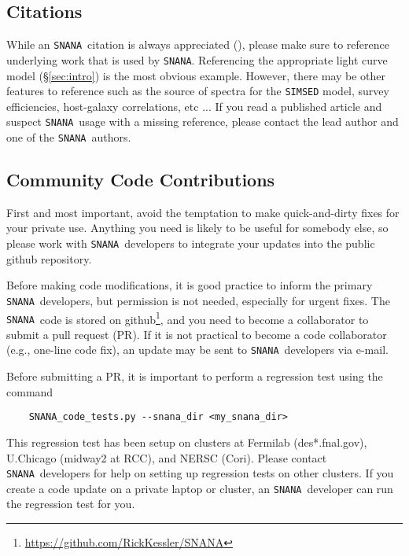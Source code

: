 \documentclass[12pt]{article}
\newcommand{\snana}{{\tt SNANA}}
\newcommand{\SNANA}{{\tt SNANA}}
\begin{document}
{%
\subsection{Citations}
\label{subsec:cite}

While an \snana\ citation is always appreciated
(\cite{SNANA09}), please make sure to reference 
underlying work that is used by \snana.
Referencing the appropriate light curve model 
(\S\ref{sec:intro}) is the most obvious example.
However, there may be other features to reference such as 
the source of spectra for the {\tt SIMSED} model,
survey efficiencies,
host-galaxy correlations, 
etc ...
If you read a published article and suspect \snana\ usage 
with a missing reference, please contact the lead author
and one of the \snana\ authors.

\clearpage
\subsection{Community Code Contributions}
\label{subsec:code_contributor}

First and most important, avoid the temptation to make quick-and-dirty
fixes for your private use. Anything you need is likely to be useful
for somebody else, so please work with \SNANA\ developers to integrate
your updates into the public github repository.

Before making code modifications, it is good practice to 
inform the primary \snana\ developers, but permission is not
needed, especially for urgent fixes.
The \snana\ code is stored on 
  github\footnote{\url{https://github.com/RickKessler/SNANA}},
and you need to become a collaborator to submit a pull request (PR).
If it is not practical to become a code collaborator
(e.g., one-line code fix),
an update may be sent to \SNANA\ developers via e-mail.

Before submitting a PR, it is important to perform
a regression test using the command
\begin{verbatim}
    SNANA_code_tests.py --snana_dir <my_snana_dir>
\end{verbatim}
%
This regression test has been setup on clusters at 
Fermilab (des*.fnal.gov), U.Chicago (midway2 at RCC), and NERSC (Cori).
Please contact \SNANA\ developers for help on setting up
regression tests on other clusters. If you create a code update 
on a private laptop or cluster, 
an \SNANA\ developer can run the regression test for you.

}
\end{document}
